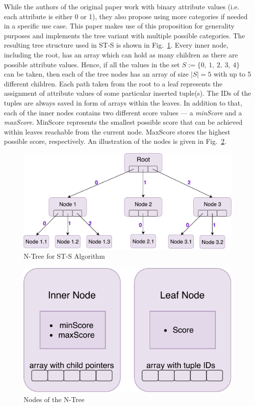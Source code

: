 While the authors of the original paper \cite{rahman} work with binary attribute values (i.e. each attribute is either 0 or 1), they also propose using more categories if needed in a specific use case. This paper makes use of this proposition for generality purposes and implements the tree variant with multiple possible categories. 
The resulting tree structure used in ST-S is shown in Fig.~\ref{fig:ntree}. Every inner node, including the root, has an array which can hold as many children as there are possible attribute values. Hence, if all the values in the set $S := \{0,~1,~2,~3,~4\}$ can be taken, then each of the tree nodes has an array of size $|S| = 5$ with up to 5 different children. Each path taken from the root to a leaf represents the assignment of attribute values of some particular inserted tuple(s). The IDs of the tuples are always saved in form of arrays within the leaves. In addition to that, each of the inner nodes contains two different score values --- a \textit{minScore} and a \textit{maxScore}. MinScore represents the smallest possible score that can be achieved within leaves reachable from the current node. MaxScore stores the highest possible score, respectively. An illustration of the nodes is given in Fig.~\ref{fig:nnode}. 

\begin{figure}[h]
	\centering
	\includegraphics[width=0.8\linewidth]{figures/ntree}
	\caption{N-Tree for ST-S Algorithm}
	\label{fig:ntree}
\end{figure}

\begin{figure}[h]
	\centering
	\includegraphics[height=0.3\linewidth]{figures/nnode}
	\caption{Nodes of the N-Tree}
	\label{fig:nnode}
\end{figure}

